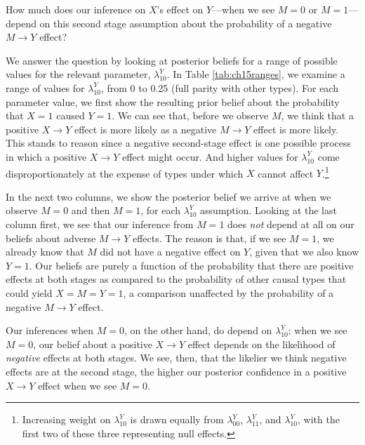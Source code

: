 \documentclass[
  12pt,
]{book}
\begin{document}
How much does our inference on \(X\)'s effect on \(Y\)---when we see \(M=0\) or \(M=1\)---depend on this second stage assumption about the probability of a negative \(M \rightarrow Y\) effect?

We answer the question by looking at posterior beliefs for a range of possible values for the relevant parameter, \(\lambda^Y_{10}\). In Table \ref{tab:ch15ranges}, we examine a range of values for \(\lambda^Y_{10}\), from 0 to 0.25 (full parity with other types). For each parameter value, we first show the resulting prior belief about the probability that \(X=1\) caused \(Y=1\). We can see that, before we observe \(M\), we think that a positive \(X \rightarrow Y\) effect is more likely as a negative \(M \rightarrow Y\) effect is more likely. This stands to reason since a negative second-stage effect is one possible process in which a positive \(X \rightarrow Y\) effect might occur. And higher values for \(\lambda^Y_{10}\) come disproportionately at the expense of types under which \(X\) cannot affect \(Y\).\footnote{Increasing weight on \(\lambda^Y_{10}\) is drawn equally from \(\lambda^Y_{00}\), \(\lambda^Y_{11}\), and \(\lambda^Y_{10}\), with the first two of these three representing null effects.}

In the next two columns, we show the posterior belief we arrive at when we observe \(M=0\) and then \(M=1\), for each \(\lambda^Y_{10}\) assumption. Looking at the last column first, we see that our inference from \(M=1\) does \emph{not} depend at all on our beliefs about adverse \(M \rightarrow Y\) effects. The reason is that, if we see \(M=1\), we already know that \(M\) did not have a negative effect on \(Y\), given that we also know \(Y=1\). Our beliefs are purely a function of the probability that there are positive effects at both stages as compared to the probability of other causal types that could yield \(X=M=Y=1\), a comparison unaffected by the probability of a negative \(M \rightarrow Y\) effect.

Our inferences when \(M=0\), on the other hand, do depend on \(\lambda^Y_{10}\): when we see \(M=0\), our belief about a positive \(X \rightarrow Y\) effect depends on the likelihood of \emph{negative} effects at both stages. We see, then, that the likelier we think negative effects are at the second stage, the higher our posterior confidence in a positive \(X \rightarrow Y\) effect when we see \(M=0\).
\end{document}
